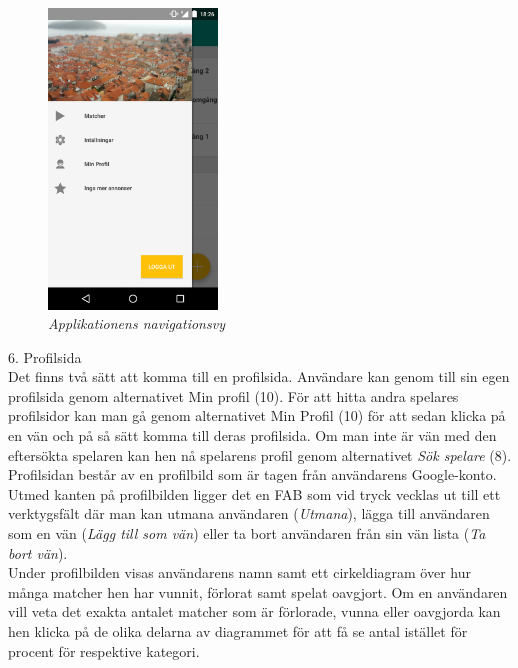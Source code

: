 \documentclass[a4paper, 11pt]{article}
\begin{document}
\begin{figure}[H]
	\begin{center}
	\includegraphics[width=0.4\textwidth]{app_drawer} 
	\end{center}
	\caption{\textit{Applikationens navigationsvy}}
\end{figure}


\pagebreak
\large \textup{6. Profilsida}\\
Det finns två sätt att komma till en profilsida. Användare kan genom till sin egen profilsida genom alternativet Min profil (10). För att hitta andra spelares profilsidor kan man gå genom alternativet Min Profil (10) för att sedan klicka på en vän och på så sätt komma till deras profilsida. Om man inte är vän med den eftersökta spelaren kan hen nå spelarens profil genom alternativet \textit{Sök spelare} (8).\\ Profilsidan består av en profilbild som är tagen från användarens Google-konto. Utmed kanten på profilbilden ligger det en FAB som vid tryck vecklas ut till ett verktygsfält där man kan utmana användaren (\textit{Utmana}), lägga till användaren som en vän (\textit{Lägg till som vän}) eller ta bort användaren från sin vän lista (\textit{Ta bort vän}).\\ Under profilbilden visas användarens namn samt ett cirkeldiagram över hur många matcher hen har vunnit, förlorat samt spelat oavgjort. Om en användaren vill veta det exakta antalet matcher som är förlorade, vunna eller oavgjorda kan hen klicka på de olika delarna av diagrammet för att få se antal istället för procent för respektive kategori.
\end{document}

